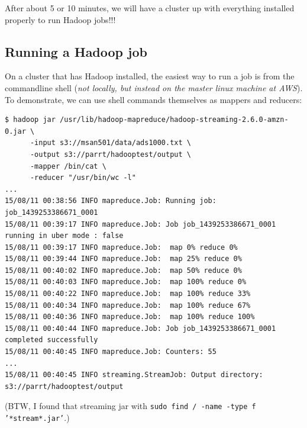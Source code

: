 \begin{fullwidth}
\begin{center}
\end{center}

After about 5 or 10 minutes, we will have a cluster up with everything installed properly to run Hadoop jobs!!!
 
\subsection{Running a Hadoop job}

On a cluster that has Hadoop installed, the easiest way to run a job is from the commandline shell ({\em not locally, but instead on the master linux machine at AWS}). To demonstrate, we can use shell commands themselves as mappers and reducers:

\begin{lstlisting}[style=BashInputStyle]
$ hadoop jar /usr/lib/hadoop-mapreduce/hadoop-streaming-2.6.0-amzn-0.jar \
      -input s3://msan501/data/ads1000.txt \
      -output s3://parrt/hadooptest/output \
      -mapper /bin/cat \
      -reducer "/usr/bin/wc -l"	
...
15/08/11 00:38:56 INFO mapreduce.Job: Running job: job_1439253386671_0001
15/08/11 00:39:17 INFO mapreduce.Job: Job job_1439253386671_0001 running in uber mode : false
15/08/11 00:39:17 INFO mapreduce.Job:  map 0% reduce 0%
15/08/11 00:39:44 INFO mapreduce.Job:  map 25% reduce 0%
15/08/11 00:40:02 INFO mapreduce.Job:  map 50% reduce 0%
15/08/11 00:40:03 INFO mapreduce.Job:  map 100% reduce 0%
15/08/11 00:40:22 INFO mapreduce.Job:  map 100% reduce 33%
15/08/11 00:40:34 INFO mapreduce.Job:  map 100% reduce 67%
15/08/11 00:40:36 INFO mapreduce.Job:  map 100% reduce 100%
15/08/11 00:40:44 INFO mapreduce.Job: Job job_1439253386671_0001 completed successfully
15/08/11 00:40:45 INFO mapreduce.Job: Counters: 55
...
15/08/11 00:40:45 INFO streaming.StreamJob: Output directory: s3://parrt/hadooptest/output
\end{lstlisting}

\noindent (BTW, I found that streaming jar with {\tt sudo find / -name -type f '*stream*.jar'}.)


\end{fullwidth}
